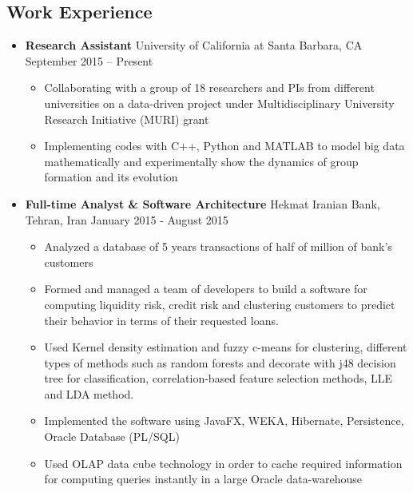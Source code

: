 \documentclass[letter]{res}
\begin{document}
\begin{resume}
		\section{Work Experience}
		\begin{itemize}[leftmargin=-.1in]
			\item \textbf{Research Assistant} \newline
			University of California at Santa Barbara, CA \hfill September 2015 – Present\\
			\vspace{-4mm}
			\iflong
			\begin{itemize}
				\item Collaborating with a group of 18 researchers and PIs from different universities on a data-driven project under Multidisciplinary University Research Initiative (MURI) grant
				\item Implementing codes with C++, Python and MATLAB to model big data mathematically and experimentally show the dynamics of group formation and its evolution
			\end{itemize}
			\fi
			
			\item \textbf{Full-time Analyst \& Software Architecture} \newline
			Hekmat Iranian Bank, Tehran, Iran \hfill January 2015 - August 2015\\
			\vspace{-4mm}
			\iflong
			\begin{itemize}
				\item Analyzed a database of 5 years transactions of half of million of bank's customers
				\item Formed and managed a team of developers to build a software for computing liquidity risk, credit risk and clustering customers to predict their behavior in terms of their requested loans. 
				\item Used Kernel density estimation and fuzzy c-means for clustering, different types of methods such as random forests and decorate with j48 decision tree for classification, correlation-based feature selection methods, LLE and LDA method.
				\item Implemented the software using JavaFX, WEKA, Hibernate, Persistence, Oracle Database (PL/SQL)
				\item Used OLAP data cube technology in order to cache required information for computing queries instantly in a large Oracle data-warehouse
			\end{itemize}
			\fi
			

\end{itemize}
\end{resume}
\end{document}
